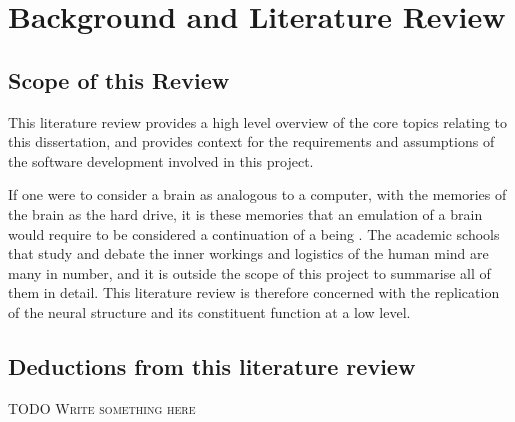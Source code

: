 \chapter{Background and Literature Review}


\section{Scope of this Review}
This literature review provides a high level overview of the core topics relating to this dissertation, and provides context for the requirements and assumptions of the software development involved in this project. 

If one were to consider a brain as analogous to a computer, with the memories of
the brain as the hard drive, it is these memories that an  emulation of a brain
would require to be considered a continuation of a being
\autocite{eichenbaum_cognitive_2011}. The academic schools that study and debate
the inner workings and logistics of the human mind are many in number, and it is
outside the scope of this project to summarise all of them in detail.  This
literature review is therefore concerned with the replication of the neural
structure and its constituent function at a low level.







\section{Deductions from this literature review}

\textsc{TODO Write something here}
